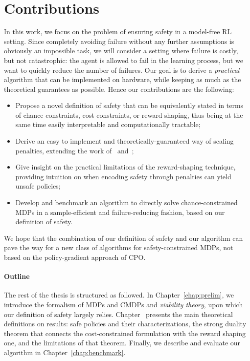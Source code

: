 \section{Contributions}
	In this work, we focus on the problem of ensuring safety in a model-free RL setting. Since completely avoiding failure without any further assumptions is obviously an impossible task, we will consider a setting where failure is costly, but not catastrophic: the agent is allowed to fail in the learning process, but we want to quickly reduce the number of failures. Our goal is to derive a\emph{ practical} algorithm that can be implemented on hardware, while keeping as much as the theoretical guarantees as possible. Hence our contributions are the following:
	\begin{itemize}
		\item Propose a novel definition of safety that can be equivalently stated in terms of chance constraints, cost constraints, or reward shaping, thus being at the same time easily interpretable and computationally tractable;
		\item Derive an easy to implement and theoretically-guaranteed way of scaling penalties, extending the work of~\cite{altman1999constrained} and~\cite{paternain2019safe};
		\item Give insight on the practical limitations of the reward-shaping technique, providing intuition on when encoding safety through penalties can yield unsafe policies;
		\item Develop and benchmark an algorithm to directly solve chance-constrained MDPs in a sample-efficient and failure-reducing fashion, based on our definition of safety.
	\end{itemize}
	We hope that the combination of our definition of safety and our algorithm can pave the way for a new class of algorithms for safety-constrained MDPs, not based on the policy-gradient approach of CPO.
	\paragraph{Outline} The rest of the thesis is structured as followed. In Chapter~\ref{chap:prelim}, we introduce the formalism of MDPs and CMDPs and\emph{ viability theory}, upon which our definition of safety largely relies. Chapter~\label{chap:safety from viability} presents the main theoretical definitions on results: safe policies and their characterizations, the strong duality theorem that connects the cost-constrained formulation with the reward shaping one, and the limitations of that theorem. Finally, we describe and evaluate our algorithm in Chapter~\ref{chap:benchmark}.